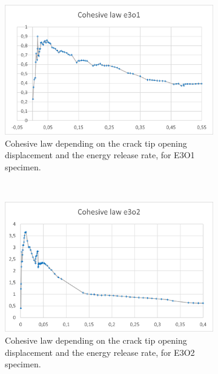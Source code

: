 \begin{figure}[H]
\centering
\begin{subfigure}{0.48\linewidth}
	\centering
	\includegraphics[scale=0.6]{Figures/e3o1_colaw}
	\decoRule
	\caption[Cohesive law from E3O1 specimen]{Cohesive law depending on the crack tip opening displacement and the energy release rate, for E3O1 specimen.}
	\label{fig:E3O1_colaw}
\end{subfigure}
\hfill\\
\begin{subfigure}{0.48\linewidth}
	\centering
	\includegraphics[scale=0.6]{Figures/e3o2_colaw}
	\decoRule
	\caption[Cohesive law from E3O2 specimen]{Cohesive law depending on the crack tip opening displacement and the energy release rate, for E3O2 specimen.}
	\label{fig:E3O2_colaw}
\end{subfigure}
\hfill\\
\begin{subfigure}{0.48\linewidth}
	\centering

\end{subfigure}
\end{figure}
